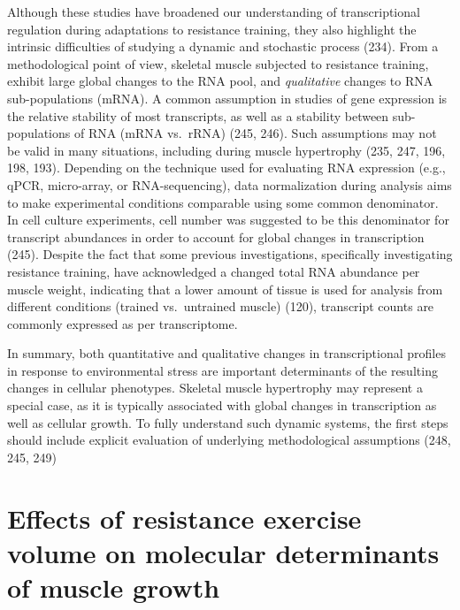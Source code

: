\documentclass[twoside,10pt]{gihclass} %
\begin{document}
Although these studies have broadened our understanding of transcriptional regulation during adaptations to resistance training, they also highlight the intrinsic difficulties of studying a dynamic and stochastic process
(234).
From a methodological point of view, skeletal muscle subjected to resistance training, exhibit large global changes to the RNA pool, and \emph{qualitative} changes to RNA sub-populations (mRNA).
A common assumption in studies of gene expression is the relative stability of most transcripts, as well as a stability between sub-populations of RNA (mRNA vs.~rRNA)
(245, 246).
Such assumptions may not be valid in many situations, including during muscle hypertrophy
(235, 247, 196, 198, 193).
Depending on the technique used for evaluating RNA expression (e.g., qPCR, micro-array, or RNA-sequencing), data normalization during analysis aims to make experimental conditions comparable using some common denominator.
In cell culture experiments, cell number was suggested to be this denominator for transcript abundances in order to account for global changes in transcription
(245).
Despite the fact that some previous investigations, specifically investigating resistance training, have acknowledged a changed total RNA abundance per muscle weight, indicating that a lower amount of tissue is used for analysis from different conditions (trained vs.~untrained muscle)
(120),
transcript counts are commonly expressed as per transcriptome.

In summary, both quantitative and qualitative changes in transcriptional profiles in response to environmental stress are important determinants of the resulting changes in cellular phenotypes. Skeletal muscle hypertrophy may represent a special case, as it is typically associated with global changes in transcription as well as cellular growth. To fully understand such dynamic systems, the first steps should include explicit evaluation of underlying methodological assumptions
(248, 245, 249)

\hypertarget{effects-of-resistance-exercise-volume-on-molecular-determinants-of-muscle-growth}{%
\section{Effects of resistance exercise volume on molecular determinants of muscle growth}\label{effects-of-resistance-exercise-volume-on-molecular-determinants-of-muscle-growth}}
\end{document}
